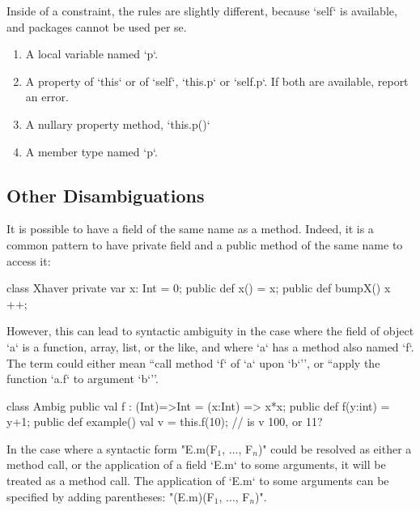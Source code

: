 Inside of a constraint, the rules are slightly different, because \xcd`self`
is available, and packages cannot be used per se.
\begin{enumerate}
\item A local variable named \xcd`p`.
\item A property of \xcd`this` or of \xcd`self`, \viz{} \xcd`this.p` or
      \xcd`self.p`.  If both are available, report an error.
\item A nullary property method, \xcd`this.p()`
\item A member type named \xcd`p`.
\end{enumerate}

\subsection{Other Disambiguations}
\label{sect:disambiguations}

It is possible to have a field of the same name as a method.
Indeed, it is a common pattern to have private field and a public
method of the same name to access it:
\begin{ex}
\begin{xten}
class Xhaver {
  private var x: Int = 0;
  public def x() = x;
  public def bumpX() { x ++; }
}
\end{xten}
%
\end{ex}

\begin{ex}
However, this can lead to syntactic ambiguity in the case where the field
 of object \xcd`a` is a
function, array, list, or the like, and where \xcd`a` has a method also named
\xcd`f`.  The term  could either mean ``call method \xcd`f` of \xcd`a` upon
\xcd`b`'', or ``apply the function \xcd`a.f` to argument \xcd`b`''.  

\begin{xten}
class Ambig {
  public val f : (Int)=>Int =  (x:Int) => x*x;
  public def f(y:int) = y+1;
  public def example() {
      val v = this.f(10);
      // is v 100, or 11?
  }
}
\end{xten}
%
\end{ex}

In the case where a syntactic form \xcdmath"E.m(F$_1$, $\ldots$, F$_n$)" could
be resolved as either a method call, or the application of a field \xcd`E.m`
to some arguments, it will be treated as a method call.  
The application of \xcd`E.m` to some arguments can be specified by adding
parentheses:  \xcdmath"(E.m)(F$_1$, $\ldots$, F$_n$)".

